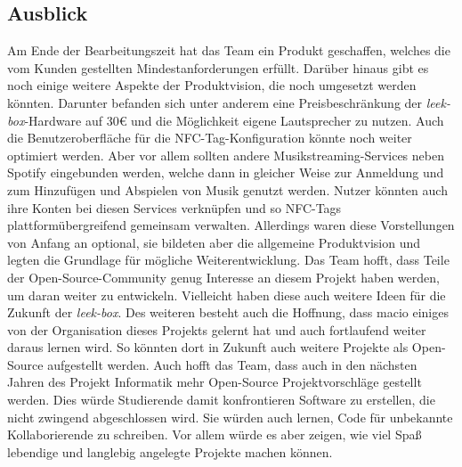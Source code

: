 \documentclass[10pt, a4paper]{article}
\begin{document}
\begin{onehalfspace}
\subsection{Ausblick}
Am Ende der Bearbeitungszeit hat das Team ein Produkt geschaffen, welches die vom Kunden gestellten Mindestanforderungen erfüllt.
Darüber hinaus gibt es noch einige weitere Aspekte der Produktvision, die noch umgesetzt werden könnten.
Darunter befanden sich unter anderem eine Preisbeschränkung der \textit{leek-box}-Hardware auf 30€ und die Möglichkeit eigene Lautsprecher zu nutzen.
Auch die Benutzeroberfläche für die NFC-Tag-Konfiguration könnte noch weiter optimiert werden.
Aber vor allem sollten andere Musikstreaming-Services neben Spotify eingebunden werden,
welche dann in gleicher Weise zur Anmeldung und zum Hinzufügen und Abspielen von Musik genutzt werden.
Nutzer könnten auch ihre Konten bei diesen Services verknüpfen und so NFC-Tags plattformübergreifend gemeinsam verwalten.
Allerdings waren diese Vorstellungen von Anfang an optional, sie bildeten aber die allgemeine Produktvision und legten die Grundlage für mögliche Weiterentwicklung.
Das Team hofft, dass Teile der Open-Source-Community genug Interesse an diesem Projekt haben werden, um daran weiter zu entwickeln.
Vielleicht haben diese auch weitere Ideen für die Zukunft der \textit{leek-box}.
Des weiteren besteht auch die Hoffnung, dass macio einiges von der Organisation dieses Projekts gelernt hat und auch fortlaufend weiter daraus lernen wird.
So könnten dort in Zukunft auch weitere Projekte als Open-Source aufgestellt werden.
Auch hofft das Team, dass auch in den nächsten Jahren des \glqq Projekt Informatik \grqq{} mehr Open-Source Projektvorschläge gestellt werden.
Dies würde Studierende damit konfrontieren Software zu erstellen, die nicht zwingend abgeschlossen wird.
Sie würden auch lernen, Code für unbekannte Kollaborierende zu schreiben.
Vor allem würde es aber zeigen, wie viel Spaß lebendige und langlebig angelegte Projekte machen können.


\end{onehalfspace}
\end{document}
